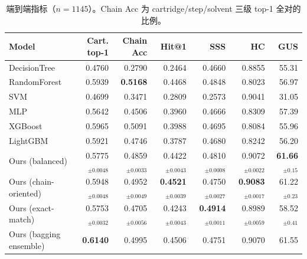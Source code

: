 \begin{table}[t]
\centering
\small
\caption{端到端指标（$n=1145$）。Chain Acc 为 cartridge/step/solvent 三级 top-1 全对的比例。}
\label{tab:end-to-end}
\begin{tabular}{lrrrrrr}
\toprule
Model & Cart. top-1 & Chain Acc & Hit@1 & SSS & HC & GUS \\
\midrule
DecisionTree & 0.4760 & 0.2790 & 0.2464 & 0.4660 & 0.8855 & 55.31 \\
RandomForest & 0.5939 & \textbf{0.5168} & 0.4468 & 0.4848 & 0.8023 & 56.97 \\
SVM & 0.4699 & 0.3471 & 0.2809 & 0.2573 & 0.9041 & 31.05 \\
MLP & 0.5642 & 0.4506 & 0.3960 & 0.4666 & 0.8309 & 57.39 \\
XGBoost & 0.5965 & 0.5091 & 0.3988 & 0.4695 & 0.8084 & 55.96 \\
LightGBM & 0.5921 & 0.4746 & 0.3787 & 0.4680 & 0.8242 & 56.20 \\
\midrule
Ours (balanced) & 0.5775$_{\pm 0.0048}$ & 0.4859$_{\pm 0.0033}$ & 0.4422$_{\pm 0.0043}$ & 0.4810$_{\pm 0.0008}$ & 0.9072$_{\pm 0.0022}$ & \textbf{61.66$_{\pm 0.15}$} \\
Ours (chain-oriented) & 0.5948$_{\pm 0.0048}$ & 0.4952$_{\pm 0.0049}$ & \textbf{0.4521$_{\pm 0.0039}$} & 0.4750$_{\pm 0.0027}$ & \textbf{0.9083$_{\pm 0.0017}$} & 61.22$_{\pm 0.23}$ \\
Ours (exact-match) & 0.5753$_{\pm 0.0032}$ & 0.4705$_{\pm 0.0056}$ & 0.4243$_{\pm 0.0043}$ & \textbf{0.4914$_{\pm 0.0011}$} & 0.8989$_{\pm 0.0059}$ & 58.52$_{\pm 0.41}$ \\
Ours (bagging ensemble) & \textbf{0.6140} & 0.4995 & 0.4506 & 0.4751 & 0.9070 & 61.55 \\
\bottomrule
\end{tabular}
\vspace{2pt}{\footnotesize 输入统一为 21 维分子描述符。我们的单模型报 4 次重复（同一数据划分、不同随机初始化）的均值与标准差；集成与传统基线是确定的单个模型，报单次结果。加粗为该列最优。 SVM 在 HC 上的高值来自退化解：它的 Cartridge F1 仅 0.059，近乎不作预测，而空预测不产生层级冲突。}
\end{table}
